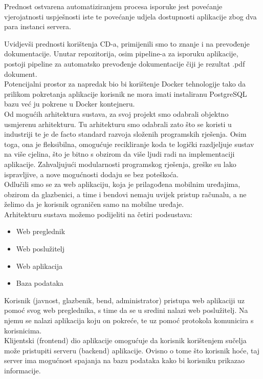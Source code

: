 	Prednost ostvarena automatiziranjem procesa isporuke jest povećanje vjerojatnosti uspješnosti iste te povećanje udjela dostupnosti aplikacije zbog dva para instanci servera.
	
	Uvidjevši prednosti korištenja CD-a, primijenili smo to znanje i na prevođenje dokumentacije. 
	Unutar repozitorija, osim pipeline-a za isporuku aplikacije, postoji pipeline za automatsko prevođenje dokumentacije čiji je rezultat .pdf dokument.\\
	
	Potencijalni prostor za napredak bio bi korištenje Docker tehnologije tako da prilikom pokretanja aplikacije korisnik ne mora imati instaliranu PostgreSQL bazu već ju pokrene u Docker kontejneru.\\

	Od mogućih arhitektura sustava, za svoj projekt smo odabrali objektno usmjerenu arhitekturu. Tu arhitekturu smo odabrali zato što se koristi u industriji te je de facto standard razvoja složenih programskih rješenja. Osim toga, ona je fleksibilna, omogućuje recikliranje koda te logički razdjeljuje sustav na više cjelina, što je bitno s obzirom da više ljudi radi na implementaciji aplikacije. Zahvaljujući modularnosti programskog rješenja, greške su lako ispravljive, a nove mogućnosti dodaju se bez poteškoća.\\

	Odlučili smo se za web aplikaciju, koja je prilagođena mobilnim uređajima, obzirom da glazbenici, a time i bendovi nemaju uvijek pristup računalu, a ne želimo da je korisnik ograničen samo na mobilne uređaje.\\

	Arhitekturu sustava možemo podijeliti na četiri podsustava:
		\begin{itemize}
			\item Web preglednik
			\item Web poslužitelj
    			\item Web aplikacija
			\item Baza podataka
		\end{itemize}


	Korisnik (javnost, glazbenik, bend, administrator) pristupa web aplikaciji uz pomoć svog web preglednika, s time da se u sredini nalazi web poslužitelj. Na njemu se nalazi aplikacija koju on pokreće, te uz pomoć protokola komunicira s korisnicima.\\

	Klijentski (frontend) dio aplikacije omogućuje da korisnik korištenjem sučelja može pristupiti serveru (backend) aplikacije. Ovisno o tome što korisnik hoće, taj server ima mogućnost spajanja na bazu podataka kako bi korisniku prikazao informacije.\\

